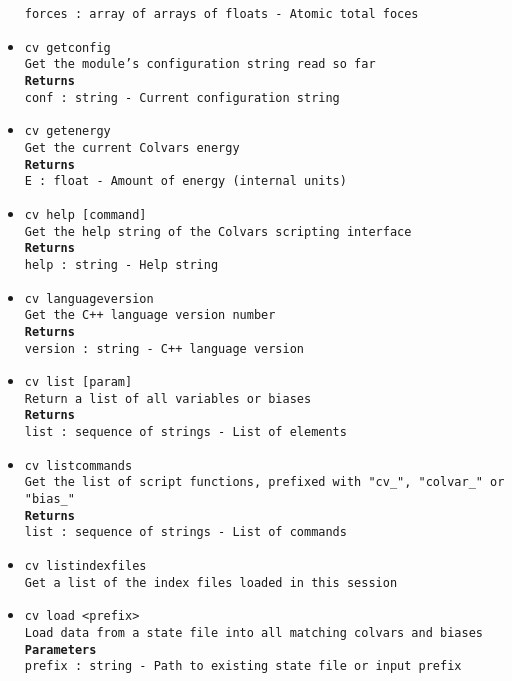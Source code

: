 \begin{itemize}
\texttt{forces : array of arrays of floats - Atomic total foces}
\item \texttt{cv getconfig}
\\
\texttt{Get the module's configuration string read so far}
\\
\texttt{\textbf{Returns}}
\\
\texttt{conf : string - Current configuration string}
\item \texttt{cv getenergy}
\\
\texttt{Get the current Colvars energy}
\\
\texttt{\textbf{Returns}}
\\
\texttt{E : float - Amount of energy (internal units)}
\item \texttt{cv help [command]}
\\
\texttt{Get the help string of the Colvars scripting interface}
\\
\texttt{\textbf{Returns}}
\\
\texttt{help : string - Help string}
\item \texttt{cv languageversion}
\\
\texttt{Get the C++ language version number}
\\
\texttt{\textbf{Returns}}
\\
\texttt{version : string - C++ language version}
\item \texttt{cv list [param]}
\\
\texttt{Return a list of all variables or biases}
\\
\texttt{\textbf{Returns}}
\\
\texttt{list : sequence of strings - List of elements}
\item \texttt{cv listcommands}
\\
\texttt{Get the list of script functions, prefixed with "cv\_", "colvar\_" or "bias\_"}
\\
\texttt{\textbf{Returns}}
\\
\texttt{list : sequence of strings - List of commands}
\item \texttt{cv listindexfiles}
\\
\texttt{Get a list of the index files loaded in this session}
\item \texttt{cv load <prefix>}
\\
\texttt{Load data from a state file into all matching colvars and biases}
\\
\texttt{\textbf{Parameters}}
\\
\texttt{prefix : string - Path to existing state file or input prefix}

\end{itemize}
